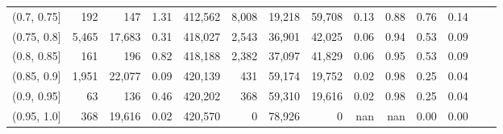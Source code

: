 \begin{tabular}{rrrrrrrrrrrrrr}
(0.7, 0.75]    &     192 &     147 &      1.31 &  412,562 &    8,008 &  19,218 &  59,708 &  0.13 &  0.88 &  0.76 &      0.14 \\
(0.75, 0.8]    &   5,465 &  17,683 &      0.31 &  418,027 &    2,543 &  36,901 &  42,025 &  0.06 &  0.94 &  0.53 &      0.09 \\
(0.8, 0.85]    &     161 &     196 &      0.82 &  418,188 &    2,382 &  37,097 &  41,829 &  0.06 &  0.95 &  0.53 &      0.09 \\
(0.85, 0.9]    &   1,951 &  22,077 &      0.09 &  420,139 &      431 &  59,174 &  19,752 &  0.02 &  0.98 &  0.25 &      0.04 \\
(0.9, 0.95]    &      63 &     136 &      0.46 &  420,202 &      368 &  59,310 &  19,616 &  0.02 &  0.98 &  0.25 &      0.04 \\
(0.95, 1.0]    &     368 &  19,616 &      0.02 &  420,570 &        0 &  78,926 &       0 &   nan &   nan &  0.00 &      0.00 \\
\bottomrule
\end{tabular}
